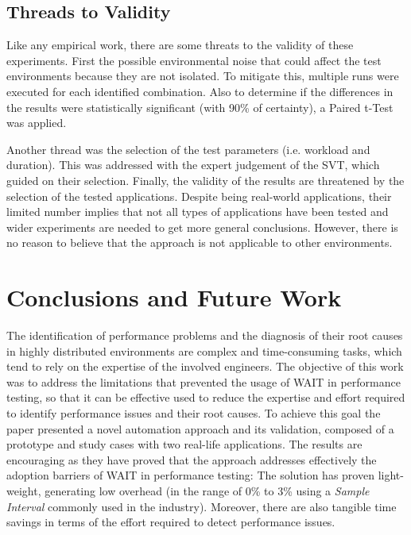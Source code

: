 \documentclass[runningheads,a4paper]{llncs}
\begin{document}
\subsection{Threads to Validity}
\vspace{-5pt}
Like any empirical work, there are some threats to the validity of these
experiments. First the possible environmental noise that could affect the test
environments because they are not isolated. To mitigate this, multiple runs were
executed for each identified combination. Also to determine if the differences
in the results were statistically significant (with 90\% of certainty), a Paired
t-Test was applied.

Another thread was the selection of the test parameters (i.e. workload and
duration). This was addressed with the expert judgement of the SVT, which guided
on their selection. Finally, the validity of the results are threatened by the
selection of the tested applications. Despite being real-world applications,
their limited number implies that not all types of applications have been tested
and wider experiments are needed to get more general conclusions. However, there
is no reason to believe that the approach is not applicable to other environments.

\vspace{-5pt}
\section{Conclusions and Future Work}
\vspace{-5pt}
The identification of performance problems and the diagnosis of their root
causes in highly distributed environments are complex and time-consuming tasks,
which tend to rely on the expertise of the involved engineers. The objective of
this work was to address the limitations that prevented the usage of WAIT in
performance testing, so that it can be effective used to reduce the expertise
and effort required to identify performance issues and their root causes. To
achieve this goal the paper presented a novel automation approach and its
validation, composed of a prototype and study cases with two real-life
applications. The results are encouraging as they have proved that the approach
addresses effectively the adoption barriers of WAIT in performance testing: The
solution has proven light-weight, generating low overhead (in the range of 0\%
to 3\% using a \emph{Sample Interval} commonly used in the industry). Moreover,
there are also tangible time savings in terms of the effort required to detect
performance issues.
\end{document}
